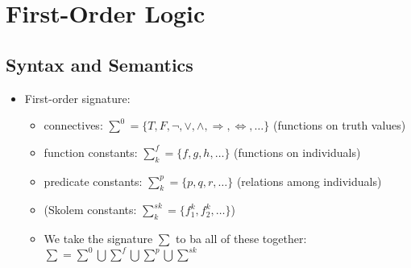 \documentclass{scrartcl}
\begin{document}
\section{First-Order Logic}
\subsection{Syntax and Semantics}
\begin{itemize}
    \item
        First-order signature:
        \begin{itemize}
            \item
                connectives: $\sum^{0} = \{T, F, \lnot, \lor, \land, \Rightarrow, \Leftrightarrow, \dots\}$ (functions on truth values)
            \item
                function constants: $\sum_{k}^{f} = \{f,g,h,\dots\}$ (functions on individuals)
            \item
                predicate constants: $\sum_{k}^{p} = \{p,q,r,\dots\}$ (relations among individuals)
            \item
                (Skolem constants: $\sum_{k}^{sk} = \{f_1^k, f_2^k, \dots\}$)
            \item
                We take the signature $\sum$ to ba all of these together: $\sum = \sum^{0} \bigcup \sum^f \bigcup \sum^p \bigcup \sum^{sk}$
        \end{itemize}
    \end{itemize}
\end{document}
